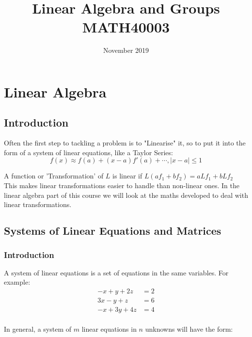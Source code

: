 \documentclass{report}
\title{Linear Algebra and Groups MATH40003}
\author{}
\date{November 2019}
\theoremstyle{remark}
\theoremstyle{definition}
\theoremstyle{definition}
\theoremstyle{theorem}
\begin{document}
\maketitle
\chapter{Linear Algebra}
\section{Introduction}
Often the first step to tackling a problem is to "Linearise" it, so to put it into the form of a system of linear equations, like a Taylor Series:
\[f(x) \approx f(a) + (x-a)f'(a) + \cdots, |x-a| \leq 1\]

A function or 'Transformation' of $L$ is linear if $ L(af_1 + bf_2) = aLf_1 + bLf_2$\\
This makes linear transformations easier to handle than non-linear ones. In the linear algebra part of this course we will look at the maths developed to deal with linear transformations.

\section{Systems of Linear Equations and Matrices}
\subsection{Introduction}
A system of linear equations is a set of equations in the same variables. For example:
\[\begin{split}
-x+y+2z &=2\\
3x -y+z &=6\\
-x +3y + 4z&=4\\
\end{split}\]

In general, a system of $m$ linear equations in $n$ unknowns will have the form:
\end{document}

